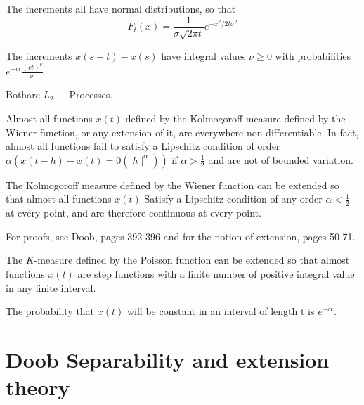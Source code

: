 \setcounter{example}{0} %
\begin{example}\label{chap2:sec17:thm72:exp1}
  The increments all have normal distributions, so that 
  $$ 
  F_t (x) =\frac{1}{\sigma \sqrt{2 \pi t}} e^{-x^2/2 t \sigma^2}
  $$
\end{example}

\begin{example}[Poisson]\label{chap2:sec17:thm72:exp2} %
  The increments $x(s + t) -x(s)$ have integral values $\nu \ge 0$ with
  probabilities $e^{-ct}\frac{(ct)^\nu}{\nu !}$  
  
  Both\pageoriginale are $L_2-$ Processes.
\end{example}

\begin{theorem}\label{chap2:sec17:thm73}%
  Almost all functions
  $x(t)$ defined by the Kolmogoroff measure defined by the Wiener function,
  or any extension of it, are everywhere non-differentiable. In fact,
  almost all functions fail to satisfy a Lipschitz condition of order
  $\alpha (x(t-h) - x(t) =0 (\mid h \mid^\alpha))$ if $\alpha >
  \frac{1}{2}$ and are not of bounded variation. 
\end{theorem}

\begin{theorem}\label{chap2:sec17:thm74} %
  The Kolmogoroff measure defined by the Wiener function can be extended
  so that almost all functions $x(t)$ Satisfy a Lipschitz condition of any
  order $\alpha < \frac{1}{2}$ at every point, and are therefore
  continuous at every point. 
  
  For proofs, see Doob, pages 392-396 and for the notion of extension,
  pages 50-71. 
\end{theorem}

\begin{theorem}\label{chap2:sec17:thm75} %
  The $K$-measure defined by the Poisson function can be extended so that
  almost functions $x(t)$ are step functions with a finite number of
  positive integral value in any finite interval. 
  
  The probability that $x(t)$ will be constant in an interval of
  length t is $e^{-ct}$. 
\end{theorem}

\section{Doob Separability and extension theory}\label{chap2:sec18}

